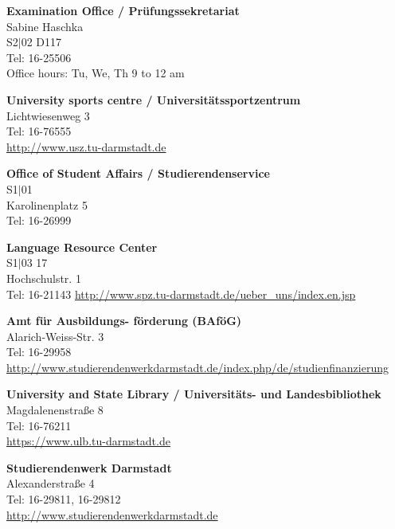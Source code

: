 \begin{multicols}{2}
\vspace{3mm}
\textbf{Examination Office / Prüfungssekretariat}\\
Sabine Haschka\\
S2$|$02 D117\\
Tel: 16-25506\\
Office hours: Tu, We, Th 9 to 12 am

\vspace{3mm}
\textbf{University sports centre / Universitätssportzentrum}\\
Lichtwiesenweg 3\\
Tel: 16-76555\\
\url{http://www.usz.tu-darmstadt.de}

\vspace{3mm}
\textbf{Office of Student Affairs / Studierendenservice}\\
S1$|$01\\
Karolinenplatz 5\\
Tel: 16-26999

\vspace{3mm}
\textbf{Language Resource Center}\\
S1$|$03 17\\
Hochschulstr. 1\\
Tel: 16-21143
\url{http://www.spz.tu-darmstadt.de/ueber_uns/index.en.jsp}

\vspace{3mm}
\textbf{Amt für Ausbildungs- förderung (BAföG)}\\
 Alarich-Weiss-Str. 3 \\
Tel: 16-29958\\
\url{http://www.studierendenwerkdarmstadt.de/index.php/de/studienfinanzierung}

\vspace{3mm}
\textbf{University and State Library / Universitäts- und Landesbibliothek}\\
Magdalenenstraße 8\\
Tel: 16-76211\\
\url{https://www.ulb.tu-darmstadt.de}

\vspace{3mm}
\textbf{Studierendenwerk Darmstadt}\\
Alexanderstraße 4 \\
Tel: 16-29811, 16-29812\\
\url{http://www.studierendenwerkdarmstadt.de}


\end{multicols}

\newpage
